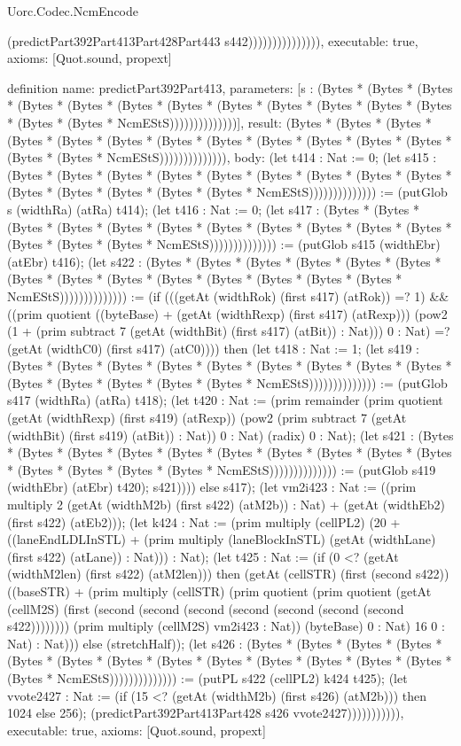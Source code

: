 \begin{lexlean}{Uorc.Codec.NcmEncode}
\begin{semanticmodule}
{(predictPart392Part413Part428Part443 s442))))))))))))))),
  executable: true,
  axioms: [Quot.sound, propext]
}

definition{
  name: predictPart392Part413,
  parameters: [s : (Bytes * (Bytes * (Bytes * (Bytes * (Bytes * (Bytes * (Bytes * (Bytes * (Bytes * (Bytes * (Bytes * (Bytes * (Bytes * (Bytes * NcmEStS))))))))))))))],
  result: (Bytes * (Bytes * (Bytes * (Bytes * (Bytes * (Bytes * (Bytes * (Bytes * (Bytes * (Bytes * (Bytes * (Bytes * (Bytes * (Bytes * NcmEStS)))))))))))))),
  body: (let t414 : Nat := 0; (let s415 : (Bytes * (Bytes * (Bytes * (Bytes * (Bytes * (Bytes * (Bytes * (Bytes * (Bytes * (Bytes * (Bytes * (Bytes * (Bytes * (Bytes * NcmEStS)))))))))))))) := (putGlob s (widthRa) (atRa) t414); (let t416 : Nat := 0; (let s417 : (Bytes * (Bytes * (Bytes * (Bytes * (Bytes * (Bytes * (Bytes * (Bytes * (Bytes * (Bytes * (Bytes * (Bytes * (Bytes * (Bytes * NcmEStS)))))))))))))) := (putGlob s415 (widthEbr) (atEbr) t416); (let s422 : (Bytes * (Bytes * (Bytes * (Bytes * (Bytes * (Bytes * (Bytes * (Bytes * (Bytes * (Bytes * (Bytes * (Bytes * (Bytes * (Bytes * NcmEStS)))))))))))))) := (if (((getAt (widthRok) (first s417) (atRok)) =? 1) && ((prim quotient ((byteBase) + (getAt (widthRexp) (first s417) (atRexp))) (pow2 (1 + (prim subtract 7 (getAt (widthBit) (first s417) (atBit)) : Nat))) 0 : Nat) =? (getAt (widthC0) (first s417) (atC0)))) then (let t418 : Nat := 1; (let s419 : (Bytes * (Bytes * (Bytes * (Bytes * (Bytes * (Bytes * (Bytes * (Bytes * (Bytes * (Bytes * (Bytes * (Bytes * (Bytes * (Bytes * NcmEStS)))))))))))))) := (putGlob s417 (widthRa) (atRa) t418); (let t420 : Nat := (prim remainder (prim quotient (getAt (widthRexp) (first s419) (atRexp)) (pow2 (prim subtract 7 (getAt (widthBit) (first s419) (atBit)) : Nat)) 0 : Nat) (radix) 0 : Nat); (let s421 : (Bytes * (Bytes * (Bytes * (Bytes * (Bytes * (Bytes * (Bytes * (Bytes * (Bytes * (Bytes * (Bytes * (Bytes * (Bytes * (Bytes * NcmEStS)))))))))))))) := (putGlob s419 (widthEbr) (atEbr) t420); s421)))) else s417); (let vm2i423 : Nat := ((prim multiply 2 (getAt (widthM2b) (first s422) (atM2b)) : Nat) + (getAt (widthEb2) (first s422) (atEb2))); (let k424 : Nat := (prim multiply (cellPL2) (20 + ((laneEndLDLInSTL) + (prim multiply (laneBlockInSTL) (getAt (widthLane) (first s422) (atLane)) : Nat))) : Nat); (let t425 : Nat := (if (0 <? (getAt (widthM2len) (first s422) (atM2len))) then (getAt (cellSTR) (first (second s422)) ((baseSTR) + (prim multiply (cellSTR) (prim quotient (prim quotient (getAt (cellM2S) (first (second (second (second (second (second (second (second s422)))))))) (prim multiply (cellM2S) vm2i423 : Nat)) (byteBase) 0 : Nat) 16 0 : Nat) : Nat))) else (stretchHalf)); (let s426 : (Bytes * (Bytes * (Bytes * (Bytes * (Bytes * (Bytes * (Bytes * (Bytes * (Bytes * (Bytes * (Bytes * (Bytes * (Bytes * (Bytes * NcmEStS)))))))))))))) := (putPL s422 (cellPL2) k424 t425); (let vvote2427 : Nat := (if (15 <? (getAt (widthM2b) (first s426) (atM2b))) then 1024 else 256); (predictPart392Part413Part428 s426 vvote2427))))))))))),
  executable: true,
  axioms: [Quot.sound, propext]
}


\end{semanticmodule}
\end{lexlean}
